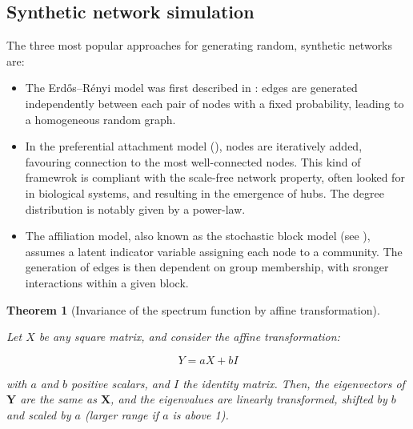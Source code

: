 \documentclass[pdflatex, sn-nature]{sn-jnl}
\theoremstyle{thmstyleone}%
\newtheorem{theorem}{Theorem}%
\theoremstyle{thmstyletwo}%
\theoremstyle{thmstylethree}%
\begin{document}
    \begin{appendices}
        \section{Synthetic network simulation}
        \label{sec-synthetic-network}

        The three most popular approaches for generating random, synthetic networks
        are:
        \begin{itemize}
            \item The Erdős–Rényi model was first described in \cite{barabasiEmergenceScalingRandom1999}:
                edges are generated independently between each pair of nodes
                with a fixed probability, leading to a homogeneous random graph.

            \item In the preferential attachment model (\cite{newmanStructureDynamicsNetworks2011,lima-mendezPowerfulLawPower2009}), nodes are iteratively added, favouring
                connection to the most well-connected nodes. This kind of
                framewrok is compliant with the scale-free network property, often
                looked for in biological systems, and resulting in the emergence
                of hubs. The degree distribution is notably given by a power-law.

            \item The affiliation model, also known as the stochastic block
                model (see \cite{hollandStochasticBlockmodelsFirst1983}), assumes
                a latent indicator variable assigning each node to a community.
                The generation of edges is then dependent on group membership, with
                sronger interactions within a given block.
        \end{itemize}


        \begin{theorem}[Invariance of the spectrum function by affine
        transformation]
            \label{supp-thm-affine}

            Let $X$ be any square matrix, and consider the affine transformation:

            \[
                Y = aX + bI
            \]

            with $a$ and $b$ positive scalars, and $I$ the identity matrix. Then,
            the eigenvectors of $\boldsymbol{Y}$ are the same as $\boldsymbol{X}$,
            and the eigenvalues are linearly transformed, shifted by $b$ and scaled
            by $a$ (larger range if $a$ is above 1).
        \end{theorem}


\end{appendices}
\end{document}
